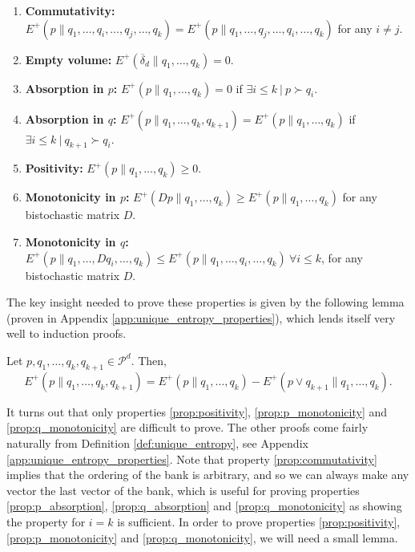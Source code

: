 \begin{enumerate}
    \item \textbf{Commutativity:} $E^+(p \parallel q_1, \dots, q_i, \dots, q_j, \dots, q_k) = E^+(p \parallel q_1, \dots, q_j, \dots, q_i, \dots, q_k)$ for any $i \neq j$. \label{prop:commutativity}
    \item \textbf{Empty volume:} $E^+(\overline{\delta}_d \parallel q_1, \dots, q_k) = 0$. \label{prop:empty}
    \item \textbf{Absorption in $p$:} $E^+(p \parallel q_1, \dots, q_k) = 0$ if $\exists i \leq k \: | \: p \succ q_i$. \label{prop:p_absorption}
    \item \textbf{Absorption in $q$:} $E^+(p \parallel q_1, \dots, q_k, q_{k+1}) = E^+(p \parallel q_1, \dots, q_k)$ if $\exists i \leq k \: | \: q_{k+1} \succ q_i$. \label{prop:q_absorption}
    \item \textbf{Positivity:} $E^+(p \parallel q_1, \dots, q_k) \geq 0$. \label{prop:positivity}
    \item \textbf{Monotonicity in $p$:} $E^+(Dp \parallel q_1, \dots, q_k) \geq E^+(p \parallel q_1, \dots, q_k)$ for any bistochastic matrix $D$. \label{prop:p_monotonicity}
    \item \textbf{Monotonicity in $q$:} $E^+(p \parallel q_1, \dots, Dq_i, \dots, q_k) \leq E^+(p \parallel q_1, \dots, q_i, \dots, q_k) \: \forall i \leq k$,  for any bistochastic matrix $D$. \label{prop:q_monotonicity}
\end{enumerate}

\noindent The key insight needed to prove these properties is given by the following lemma (proven in Appendix \ref{app:unique_entropy_properties}), which lends itself very well to induction proofs.

\begin{lemma} \label{lem:induction_trick}
    Let $p, q_1, \dots, q_k, q_{k+1} \in \mathcal{P}^d$. Then,
    \begin{equation}
        E^+(p \parallel q_1, \dots, q_k, q_{k+1}) = E^+(p \parallel q_1, \dots, q_k) - E^+(p \vee q_{k+1} \parallel q_1, \dots, q_k).
    \end{equation}
\end{lemma}

It turns out that only properties \ref{prop:positivity}, \ref{prop:p_monotonicity} and \ref{prop:q_monotonicity} are difficult to prove. The other proofs come fairly naturally from Definition \ref{def:unique_entropy}, see Appendix \ref{app:unique_entropy_properties}. Note that property \ref{prop:commutativity} implies that the ordering of the bank is arbitrary, and so we can always make any vector the last vector of the bank, which is useful for proving properties \ref{prop:p_absorption}, \ref{prop:q_absorption} and \ref{prop:q_monotonicity} as showing the property for $i = k$ is sufficient. In order to prove properties \ref{prop:positivity}, \ref{prop:p_monotonicity} and \ref{prop:q_monotonicity}, we will need a small lemma.

